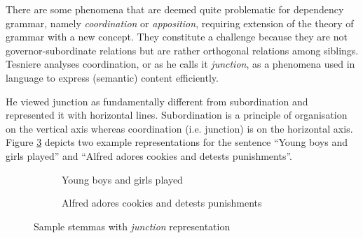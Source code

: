     There are some phenomena that are deemed quite problematic for dependency grammar, namely \textit{coordination} or \textit{apposition}, requiring extension of the theory of grammar with a new concept. They constitute a challenge because they are not governor-subordinate relations but are rather orthogonal relations among siblings. Tesniere analyses coordination, or as he calls it \textit{junction}, as a phenomena used in language to express (semantic) content efficiently. 
    
    He viewed junction as fundamentally different from subordination and represented it with horizontal lines. Subordination is a principle of organisation on the vertical axis whereas coordination (i.e. junction) is on the horizontal axis. Figure \ref{fig:stemma3} depicts two example representations for the sentence ``Young boys and girls played'' and ``Alfred adores cookies and detests punishments''. 

    \begin{figure}[!ht]
        \centering
        \begin{subfigure}{.35\textwidth}
            \centering
            \caption{Young boys and girls played}
            \label{fig:stemma3-sub1}
        \end{subfigure}%
        \begin{subfigure}{.65\textwidth}
            \centering
            \caption{Alfred adores cookies and detests punishments}
            \label{fig:stemma3-sub2}
        \end{subfigure}
        \caption{Sample stemmas with \textit{junction} representation}
        \label{fig:stemma3}
    \end{figure}

